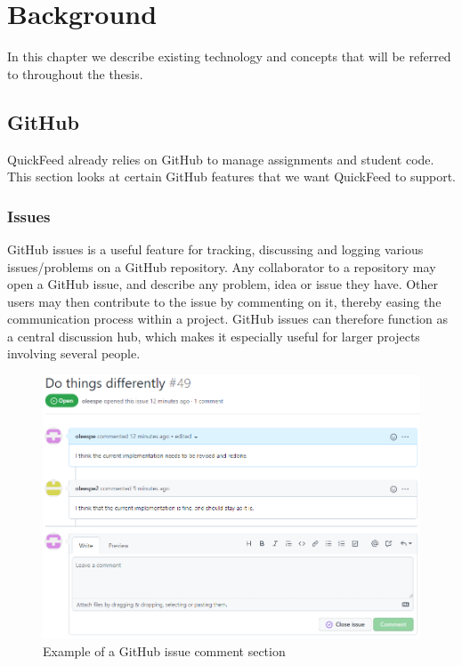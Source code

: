 
\chapter{Background}
\label{ch:background}

In this chapter we describe existing technology and concepts that will be referred to throughout the thesis.

\section{GitHub}

QuickFeed already relies on GitHub to manage assignments and student code.
This section looks at certain GitHub features that we want QuickFeed to support.

\subsection{Issues}

GitHub issues is a useful feature for tracking, discussing and logging various issues/problems on a GitHub repository.
Any collaborator to a repository may open a GitHub issue, and describe any problem, idea or issue they have.
Other users may then contribute to the issue by commenting on it, thereby easing the communication process within a project.
GitHub issues can therefore function as a central discussion hub, which makes it especially useful for larger projects involving several people. 

\begin{figure}[ht]
    \centering
    \includegraphics[width=\textwidth]{photos/github-issue.PNG}
    \caption{Example of a GitHub issue comment section}
    \label{fig:github-issue}
\end{figure}

